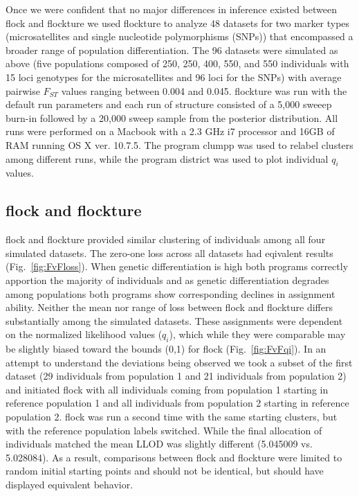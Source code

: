 Once we were confident that no major differences in inference existed between  {\sc flock} and {\sc flockture}
we used  {\sc flockture} to analyze 48 datasets for two marker types 
(microsatellites and single nucleotide polymorphisms (SNPs))  that encompassed a broader 
range of population differentiation. The 96 datasets were simulated as above (five populations 
composed of 250, 250, 400, 550, and 550 individuals with 15 loci genotypes for the microsatellites
and 96 loci for the SNPs)
with average pairwise $F_{ST}$ values ranging between 0.004 and 0.045. 
 {\sc flockture} was run with the default run parameters and each run of 
{\sc structure} consisted of a 5,000 sweeep burn-in followed by a 20,000 sweep sample
from the posterior distribution. All runs were performed on a Macbook with a 2.3 GHz i7 processor
and 16GB of RAM running OS X ver. 10.7.5. The program {\sc clumpp} \citep{Jak&Ros2007} 
was used to relabel clusters among different runs,
while the program {\sc district} \citep{Rosenberg2004} was used to plot individual \textit{$q_i$} values.

\subsection*{{\sc flock} and {\sc flockture}} 
{\sc flock} and {\sc flockture} provided similar clustering of individuals among all four 
simulated datasets. The zero-one loss across all datasets had eqivalent results (Fig.~\ref{fig:FvFloss}).
When genetic differentiation is high both programs correctly apportion the majority of individuals and 
as genetic differentiation degrades among populations both programs show corresponding declines in 
assignment ability. Neither the mean nor range of loss between {\sc flock} and {\sc flockture} differs
substantially among the simulated datasets. These assignments were dependent on the normalized likelihood
values ($q_i$), which while they were comparable may be slightly biased toward the bounds (0,1)
for {\sc flock} (Fig.~\ref{fig:FvFqi}). In an attempt to understand the deviations being observed we took a subset of the 
first dataset (29 individuals from population 1 and 21 individuals from population 2) and initiated 
{\sc flock} with all individuals coming from population 1 starting in reference population 1 and all 
individuals from population 2 starting in reference population 2. {\sc flock} was run a second time
with the same starting clusters, but with the reference population labels switched. While the final allocation
of individuals matched the mean LLOD was slightly different (5.045009 vs. 5.028084). As a result, comparisons
between {\sc flock} and {\sc flockture} were limited to random initial starting points and should not 
be identical, but should have displayed equivalent behavior. 

